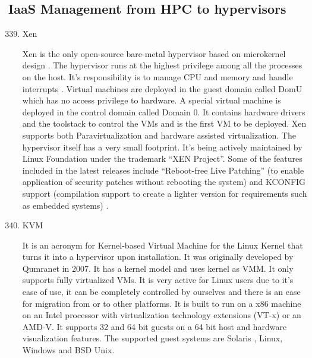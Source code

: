 \subsection{IaaS Management from HPC to hypervisors}
\label{\detokenize{i524/technologies:iaas-management-from-hpc-to-hypervisors}}\begin{enumerate}
\setcounter{enumi}{338}
\item {} 
Xen

Xen is the only open-source bare-metal hypervisor based on
microkernel design \label{\detokenize{i524/technologies:id619}}{\hyperref[\detokenize{i524/technologies:www-xen-wikipedia}]{\sphinxcrossref{{[}534{]}}}}. The hypervisor runs
at the highest privilege among all the processes on the
host. It's responsibility is to manage CPU and memory and handle
interrupts \label{\detokenize{i524/technologies:id620}}{\hyperref[\detokenize{i524/technologies:www-xen-overview}]{\sphinxcrossref{{[}535{]}}}}. Virtual machines are
deployed in the guest domain called DomU which has no access
privilege to hardware. A special virtual machine is deployed in
the control domain called Domain 0. It contains hardware drivers
and the toolstack to control the VMs and is the first VM to be
deployed. Xen supports both Paravirtualization and hardware
assisted virtualization. The hypervisor itself has a very small
footprint. It's being actively maintained by Linux Foundation
under the trademark ``XEN Project''. Some of the features included
in the latest releases include ``Reboot-free Live Patching'' (to
enable application of security patches without rebooting the
system) and KCONFIG support (compilation support to create a
lighter version for requirements such as embedded systems)
\label{\detokenize{i524/technologies:id621}}{\hyperref[\detokenize{i524/technologies:www-xen-fl}]{\sphinxcrossref{{[}536{]}}}}.

\item {} 
KVM

\label{\detokenize{i524/technologies:id622}}{\hyperref[\detokenize{i524/technologies:www-kvm-wiki}]{\sphinxcrossref{{[}537{]}}}} It is an acronym for Kernel-based Virtual
Machine for the Linux Kernel that turns it into a hypervisor upon
installation. It was originally developed by Qumranet in 2007. It
has a kernel model and uses kernel as VMM. It only supports fully
virtualized VMs. It is very active for Linux users due to it’s
ease of use, it can be completely controlled by ourselves and
there is an ease for migration from or to other
platforms. \label{\detokenize{i524/technologies:id623}}{\hyperref[\detokenize{i524/technologies:www-kvm-webpage}]{\sphinxcrossref{{[}538{]}}}} It is built to run on a x86
machine on an Intel processor with virtualization technology
extensions (VT-x) or an AMD-V. It supports 32 and 64 bit guests
on a 64 bit host and hardware visualization features. The
supported guest systems are Solaris , Linux, Windows and BSD
Unix.


\end{enumerate}
